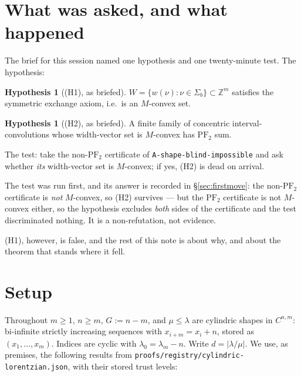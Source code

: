 \documentclass[11pt]{article}
\theoremstyle{plain}
\theoremstyle{definition}
\newtheorem{hypothesis}[theorem]{Hypothesis}
\newcommand{\PFtwo}{\mathrm{PF}_2}
\newcommand{\Z}{\mathbb{Z}}
\begin{document}
\begin{abstract}
\smallskip
\noindent In particular, by \texttt{A-M-profile-box-slice}, the horizontal-strip-defect
sublevel sets $\Sigma_b^{\le j}$ of every slice, at every $m$, are $M$-convex. The
theorem is sharp in a way that matters: the same statement for a \emph{general} separable
convex $\phi$ is false ($1308/12081$ failures, witness recorded), so it is not a
corollary of separable-convex theory --- it uses that $t\mapsto(-t)_+$ is $1$-Lipschitz
and monotone. Tested in the abstract class its hypotheses carve out (all boxes in
$[-3,3]$, all $\sigma$, all $j$, $m=2,3,4$): $109\,564$ tests, $0$ failures.
\end{abstract}

\section{What was asked, and what happened}

The brief for this session named one hypothesis and one twenty-minute test. The
hypothesis:
\begin{hypothesis}[(H1), as briefed]\label{hyp:H1}
$W=\{w(\nu):\nu\in\Sigma_b\}\subset\Z^m$ satisfies the symmetric exchange axiom, i.e.\ is
an $M$-convex set.
\end{hypothesis}
\begin{hypothesis}[(H2), as briefed]\label{hyp:H2}
A finite family of concentric interval-convolutions whose width-vector set is $M$-convex
has $\PFtwo$ sum.
\end{hypothesis}
The test: take the non-$\PFtwo$ certificate of \texttt{A-shape-blind-impossible} and ask
whether \emph{its} width-vector set is $M$-convex; if yes, (H2) is dead on arrival.

The test was run first, and its answer is recorded in \S\ref{sec:firstmove}: the
non-$\PFtwo$ certificate is \emph{not} $M$-convex, so (H2) survives --- but the
$\PFtwo$ certificate is not $M$-convex either, so the hypothesis excludes \emph{both}
sides of the certificate and the test discriminated nothing. It is a non-refutation, not
evidence.

(H1), however, is false, and the rest of this note is about why, and about the theorem
that stands where it fell.

\section{Setup}\label{sec:setup}

Throughout $m\ge 1$, $n\ge m$, $G:=n-m$, and $\mu\le\lambda$ are cylindric shapes in
$C^{n,m}$: bi-infinite strictly increasing sequences with $x_{i+m}=x_i+n$, stored as
$(x_1,\dots,x_m)$. Indices are cyclic with $\lambda_0=\lambda_m-n$. Write
$d=|\lambda/\mu|$. We use, as premises, the following results from
\texttt{proofs/registry/cylindric-lorentzian.json}, with their stored trust levels:
\end{document}
